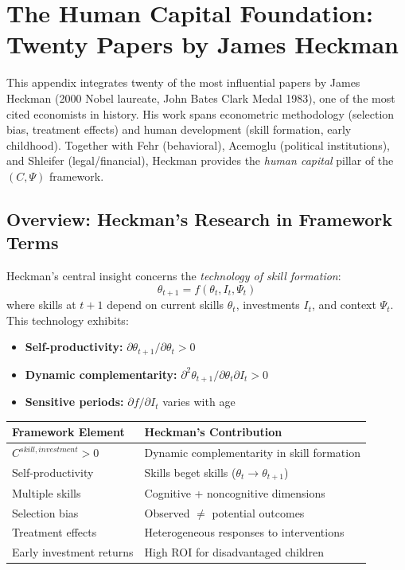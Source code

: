 \section{The Human Capital Foundation: Twenty Papers by James Heckman}
\label{app:heckman}

This appendix integrates twenty of the most influential papers by James Heckman
(2000 Nobel laureate, John Bates Clark Medal 1983), one of the most cited
economists in history. His work spans econometric methodology (selection bias,
treatment effects) and human development (skill formation, early childhood).
Together with Fehr (behavioral), Acemoglu (political institutions), and
Shleifer (legal/financial), Heckman provides the \emph{human capital} pillar
of the $(C, \Psi)$ framework.

\subsection{Overview: Heckman's Research in Framework Terms}

Heckman's central insight concerns the \emph{technology of skill formation}:
\begin{equation}
  \theta_{t+1} = f(\theta_t, I_t, \Psi_t)
\end{equation}
where skills at $t+1$ depend on current skills $\theta_t$, investments $I_t$,
and context $\Psi_t$. This technology exhibits:
\begin{itemize}
  \item \textbf{Self-productivity:} $\partial\theta_{t+1}/\partial\theta_t > 0$
  \item \textbf{Dynamic complementarity:} $\partial^2\theta_{t+1}/\partial\theta_t\partial I_t > 0$
  \item \textbf{Sensitive periods:} $\partial f/\partial I_t$ varies with age
\end{itemize}

\begin{center}
\renewcommand{\arraystretch}{1.2}
\small
\begin{tabular}{ll}
\hline
\textbf{Framework Element} & \textbf{Heckman's Contribution} \\
\hline
$C^{skill,investment} > 0$ & Dynamic complementarity in skill formation \\
Self-productivity & Skills beget skills ($\theta_t \to \theta_{t+1}$) \\
Multiple skills & Cognitive + noncognitive dimensions \\
Selection bias & Observed $\neq$ potential outcomes \\
Treatment effects & Heterogeneous responses to interventions \\
Early investment returns & High ROI for disadvantaged children \\
\hline
\end{tabular}
\end{center}

